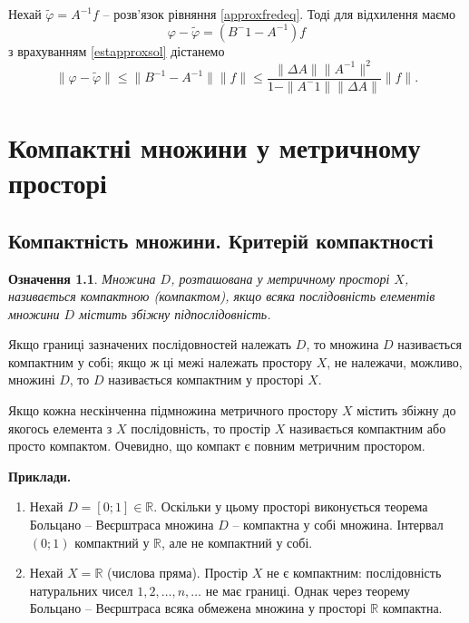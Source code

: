 \documentclass[14pt,twoside]{extreport}
\theoremstyle{mystyle}
\newtheorem{dfn}{Означення}
\numberwithin{equation}{chapter}
\begin{document}
Нехай $\tilde{\varphi} = A^{-1} f$ -- розв'язок рівняння \eqref{approxfredeq}. Тоді для відхилення маємо
\[
 \varphi - \tilde{\varphi} = (B^-1 - A^{-1}) f
\]
з врахуванням \eqref{estapproxsol} дістанемо
\begin{equation}
 \|\varphi - \tilde{\varphi} \| \leqslant \|B^{-1} - A^{-1} \| \|f\| \leqslant \frac{\|\Delta A\| \|A^{-1}\|^2}{1-\|A^-1\|\|\Delta A\|} \|f\|.
\end{equation}


\chapter{Компактні множини у метричному просторі}

\section{Компактність множини. Критерій компактності}

\begin{dfn}
	Множина $D$, розташована у метричному просторі $X$, називається компактною (компактом), якщо всяка послідовність елементів множини $D$ містить збіжну підпослідовність.
\end{dfn}

Якщо границі зазначених послідовностей належать $D$, то множина $D$ називається компактним у собі; якщо ж ці межі належать простору $X$, не належачи, можливо, множині $D$, то $D$ називається компактним у просторі $X$.

Якщо кожна нескінченна підмножина метричного простору $X$ містить збіжну до якогось елемента з $X$ послідовність, то простір $X$ називається компактним або просто компактом. Очевидно, що компакт є повним метричним простором.

\textbf{Приклади.}
\begin{enumerate}
	\item Нехай $D = [0; 1] \in \mathbb{R}$. Оскільки у цьому просторі виконується теорема Больцано -- Веєрштраса множина $D$ -- компактна у собі множина. Інтервал $(0; 1)$ компактний у $\mathbb{R}$, але не компактний у собі.
	\item Нехай $X = \mathbb{R}$ (числова пряма). Простір $X$ не є компактним: послідовність натуральних чисел $1, 2, \ldots, n, \ldots$ не має границі. Однак через теорему Больцано -- Веєрштраса всяка обмежена множина у просторі $\mathbb{R}$ компактна.
\end{enumerate}
\end{document}
